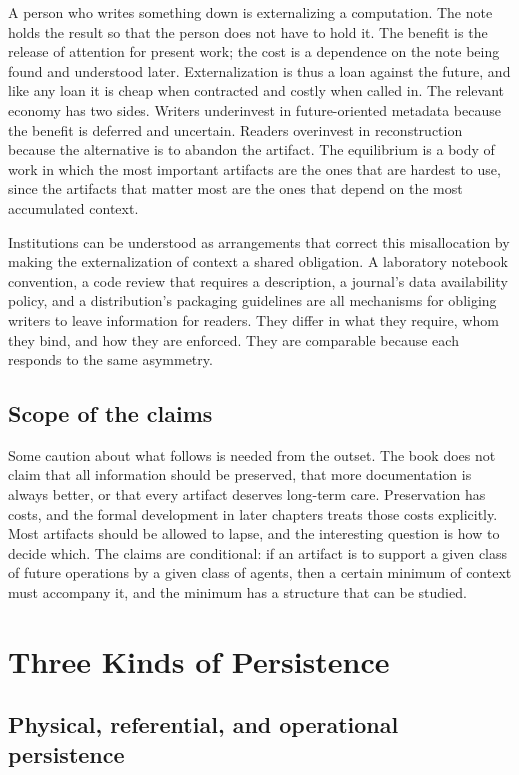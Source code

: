 \documentclass[11pt,twoside,openright]{book}
\theoremstyle{plain}
\theoremstyle{definition}
\theoremstyle{remark}
\begin{document}
A person who writes something down is externalizing a computation. The note holds the result so that the person does not have to hold it. The benefit is the release of attention for present work; the cost is a dependence on the note being found and understood later. Externalization is thus a loan against the future, and like any loan it is cheap when contracted and costly when called in. The relevant economy has two sides. Writers underinvest in future-oriented metadata because the benefit is deferred and uncertain. Readers overinvest in reconstruction because the alternative is to abandon the artifact. The equilibrium is a body of work in which the most important artifacts are the ones that are hardest to use, since the artifacts that matter most are the ones that depend on the most accumulated context.

Institutions can be understood as arrangements that correct this misallocation by making the externalization of context a shared obligation. A laboratory notebook convention, a code review that requires a description, a journal's data availability policy, and a distribution's packaging guidelines are all mechanisms for obliging writers to leave information for readers. They differ in what they require, whom they bind, and how they are enforced. They are comparable because each responds to the same asymmetry.

\section{Scope of the claims}

Some caution about what follows is needed from the outset. The book does not claim that all information should be preserved, that more documentation is always better, or that every artifact deserves long-term care. Preservation has costs, and the formal development in later chapters treats those costs explicitly. Most artifacts should be allowed to lapse, and the interesting question is how to decide which. The claims are conditional: if an artifact is to support a given class of future operations by a given class of agents, then a certain minimum of context must accompany it, and the minimum has a structure that can be studied.

\chapter{Three Kinds of Persistence}\label{ch:persistence}

\section{Physical, referential, and operational persistence}
\end{document}
